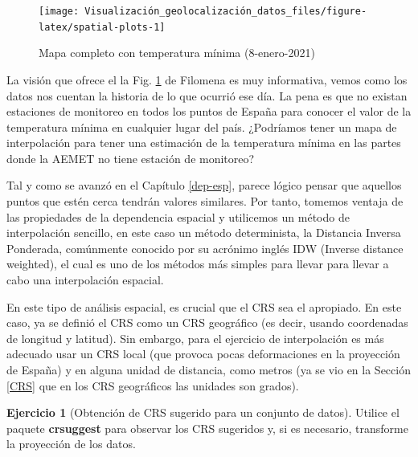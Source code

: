 \documentclass[
]{book}
\theoremstyle{definition}
\theoremstyle{definition}
\theoremstyle{definition}
\newtheorem{exercise}{Ejercicio}[chapter]
\theoremstyle{definition}
\theoremstyle{remark}
\begin{document}
\begin{figure}

{\centering \texttt{[image: Visualización\_geolocalización\_datos\_files/figure-latex/spatial-plots-1]} 

}

\caption{Mapa completo con temperatura mínima (8-enero-2021)}\label{fig:spatial-plots}
\end{figure}

La visión que ofrece el la Fig. \ref{fig:spatial-plots} de Filomena es muy
informativa, vemos como los datos nos cuentan la historia de lo que ocurrió ese
día. La pena es que no existan estaciones de monitoreo en todos los puntos de
España para conocer el valor de la temperatura mínima en cualquier lugar del
país. ¿Podríamos tener un mapa de interpolación para tener una estimación de la
temperatura mínima en las partes donde la AEMET no tiene estación de monitoreo?

Tal y como se avanzó en el Capítulo \ref{dep-esp}, parece lógico pensar que
aquellos puntos que estén cerca tendrán valores similares. Por tanto, tomemos
ventaja de las propiedades de la dependencia espacial y utilicemos un método de
interpolación sencillo, en este caso un método determinista, la Distancia
Inversa Ponderada, comúnmente conocido por su acrónimo inglés IDW (Inverse
distance weighted), el cual es uno de los métodos más simples para llevar para
llevar a cabo una interpolación espacial.

En este tipo de análisis espacial, es crucial que el CRS sea el apropiado. En
este caso, ya se definió el CRS como un CRS geográfico (es decir, usando
coordenadas de longitud y latitud). Sin embargo, para el ejercicio de
interpolación es más adecuado usar un CRS local (que provoca pocas deformaciones
en la proyección de España) y en alguna unidad de distancia, como metros (ya se
vio en la Sección \ref{CRS} que en los CRS geográficos las unidades son
grados).

\begin{exercise}[Obtención de CRS sugerido para un conjunto de datos]
\protect\hypertarget{exr:ex11}{}\label{exr:ex11}Utilice el paquete \textbf{crsuggest} para observar los CRS sugeridos y, si es
necesario, transforme la proyección de los datos.
\end{exercise}
\end{document}
